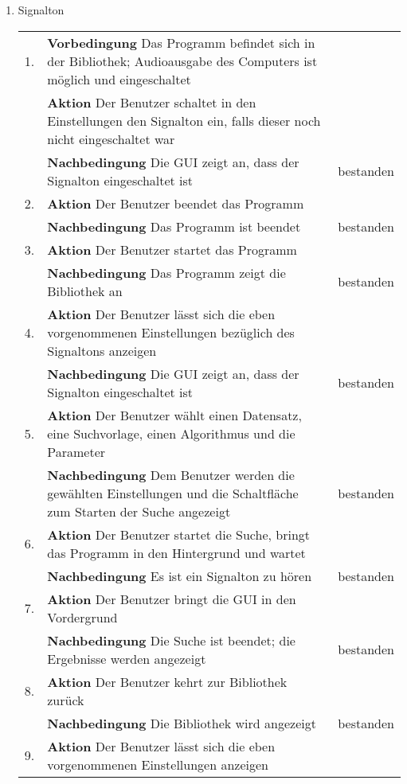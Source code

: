 \begin{enumerate} [label=\bfseries /TSW \arabic*0/, leftmargin=*]
	\item Signalton \newline \newline
	\begin{tabular}{rp{4in}|l}
	1. & \textbf{Vorbedingung} Das Programm befindet sich in der Bibliothek; Audioausgabe des Computers ist möglich und eingeschaltet & \\
	   & \textbf{Aktion} Der Benutzer schaltet in den Einstellungen den Signalton ein, falls dieser noch nicht eingeschaltet war & \\ 
	   & \textbf{Nachbedingung} Die GUI zeigt an, dass der Signalton eingeschaltet ist & bestanden \\
	\hline
	2. & \textbf{Aktion} Der Benutzer beendet das Programm & \\
	   & \textbf{Nachbedingung} Das Programm ist beendet & bestanden \\
	\hline
	3. & \textbf{Aktion} Der Benutzer startet das Programm & \\
	   & \textbf{Nachbedingung} Das Programm zeigt die Bibliothek an & bestanden \\
	\hline
	4. & \textbf{Aktion} Der Benutzer lässt sich die eben vorgenommenen Einstellungen bezüglich des Signaltons anzeigen & \\
	   & \textbf{Nachbedingung} Die GUI zeigt an, dass der Signalton eingeschaltet ist & bestanden \\
	\hline
	5. & \textbf{Aktion} Der Benutzer wählt einen Datensatz, eine Suchvorlage, einen Algorithmus und die Parameter & \\
	   & \textbf{Nachbedingung} Dem Benutzer werden die gewählten Einstellungen und die Schaltfläche zum Starten der Suche angezeigt & bestanden \\
	\hline
	6. & \textbf{Aktion} Der Benutzer startet die Suche, bringt das Programm in den Hintergrund und wartet & \\
	   & \textbf{Nachbedingung} Es ist ein Signalton zu hören & bestanden \\
	\hline
	7. & \textbf{Aktion} Der Benutzer bringt die GUI in den Vordergrund & \\
	   & \textbf{Nachbedingung} Die Suche ist beendet; die Ergebnisse werden angezeigt & bestanden \\
	\hline
	8. & \textbf{Aktion} Der Benutzer kehrt zur Bibliothek zurück & \\
	   & \textbf{Nachbedingung} Die Bibliothek wird angezeigt & bestanden \\
	\hline
	9. & \textbf{Aktion} Der Benutzer lässt sich die eben vorgenommenen Einstellungen anzeigen & \\

\end{tabular}
\end{enumerate}
